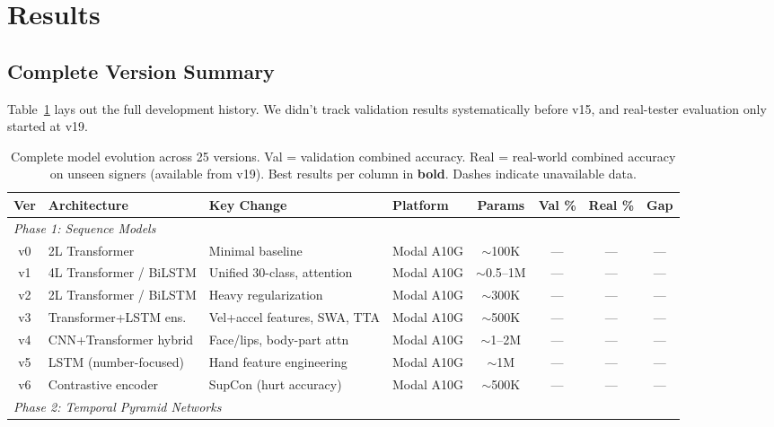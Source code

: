 \documentclass[conference]{IEEEtran}
\begin{document}
\section{Results}

\subsection{Complete Version Summary}

Table~\ref{tab:full_evolution} lays out the full development history. We didn't track validation results systematically before v15, and real-tester evaluation only started at v19.

\begin{table}[t]
\centering
\caption{Complete model evolution across 25 versions. Val = validation combined accuracy. Real = real-world combined accuracy on unseen signers (available from v19). Best results per column in \textbf{bold}. Dashes indicate unavailable data.}
\label{tab:full_evolution}
\small
\begin{tabular}{@{}clllcccc@{}}
\toprule
\textbf{Ver} & \textbf{Architecture} & \textbf{Key Change} & \textbf{Platform} & \textbf{Params} & \textbf{Val \%} & \textbf{Real \%} & \textbf{Gap} \\
\midrule
\multicolumn{8}{l}{\textit{Phase 1: Sequence Models}} \\
v0  & 2L Transformer        & Minimal baseline           & Modal A10G & $\sim$100K & --- & --- & --- \\
v1  & 4L Transformer / BiLSTM & Unified 30-class, attention & Modal A10G & $\sim$0.5--1M & --- & --- & --- \\
v2  & 2L Transformer / BiLSTM & Heavy regularization       & Modal A10G & $\sim$300K & --- & --- & --- \\
v3  & Transformer+LSTM ens.  & Vel+accel features, SWA, TTA & Modal A10G & $\sim$500K & --- & --- & --- \\
v4  & CNN+Transformer hybrid & Face/lips, body-part attn  & Modal A10G & $\sim$1--2M & --- & --- & --- \\
v5  & LSTM (number-focused)  & Hand feature engineering    & Modal A10G & $\sim$1M & --- & --- & --- \\
v6  & Contrastive encoder    & SupCon (hurt accuracy)     & Modal A10G & $\sim$500K & --- & --- & --- \\
\midrule
\multicolumn{8}{l}{\textit{Phase 2: Temporal Pyramid Networks}} \\

\end{tabular}
\end{table}
\end{document}
